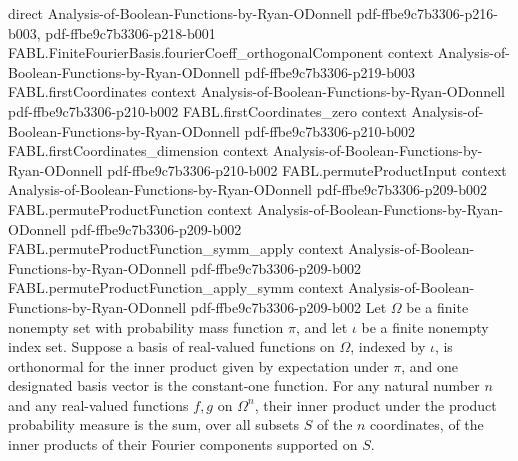 \begin{theorem}
  {direct}
  {Analysis-of-Boolean-Functions-by-Ryan-ODonnell}
  {pdf-ffbe9c7b3306-p216-b003,
    pdf-ffbe9c7b3306-p218-b001}
\proofstep
  {FABL.FiniteFourierBasis.fourierCoeff_orthogonalComponent}
  {context}
  {Analysis-of-Boolean-Functions-by-Ryan-ODonnell}
  {pdf-ffbe9c7b3306-p219-b003}
\proofstep
  {FABL.firstCoordinates}
  {context}
  {Analysis-of-Boolean-Functions-by-Ryan-ODonnell}
  {pdf-ffbe9c7b3306-p210-b002}
\proofstep
  {FABL.firstCoordinates_zero}
  {context}
  {Analysis-of-Boolean-Functions-by-Ryan-ODonnell}
  {pdf-ffbe9c7b3306-p210-b002}
\proofstep
  {FABL.firstCoordinates_dimension}
  {context}
  {Analysis-of-Boolean-Functions-by-Ryan-ODonnell}
  {pdf-ffbe9c7b3306-p210-b002}
\proofstep
  {FABL.permuteProductInput}
  {context}
  {Analysis-of-Boolean-Functions-by-Ryan-ODonnell}
  {pdf-ffbe9c7b3306-p209-b002}
\proofstep
  {FABL.permuteProductFunction}
  {context}
  {Analysis-of-Boolean-Functions-by-Ryan-ODonnell}
  {pdf-ffbe9c7b3306-p209-b002}
\proofstep
  {FABL.permuteProductFunction_symm_apply}
  {context}
  {Analysis-of-Boolean-Functions-by-Ryan-ODonnell}
  {pdf-ffbe9c7b3306-p209-b002}
\proofstep
  {FABL.permuteProductFunction_apply_symm}
  {context}
  {Analysis-of-Boolean-Functions-by-Ryan-ODonnell}
  {pdf-ffbe9c7b3306-p209-b002}
Let $\Omega$ be a finite nonempty set with probability mass function $\pi$, and let
$\iota$ be a finite nonempty index set. Suppose a basis of real-valued functions on
$\Omega$, indexed by $\iota$, is orthonormal for the inner product given by expectation
under $\pi$, and one designated basis vector is the constant-one function. For any
natural number $n$ and any real-valued functions $f,g$ on $\Omega^n$, their inner
product under the product probability measure is the sum, over all subsets $S$ of the
$n$ coordinates, of the inner products of their Fourier components supported on $S$.
\end{theorem}

